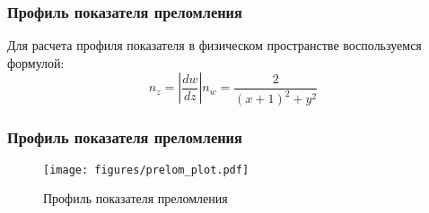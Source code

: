 \begin{frame}\frametitle{Профиль показателя преломления}
	Для расчета профиля показателя в физическом пространстве воспользуемся формулой:
	\begin{equation}
		n_z =
		\left|\frac{dw}{dz}\right| n_w =
		\frac{2}{(x+1)^2+y^2}
		\label{eq:pok_prelom}
	\end{equation}

\end{frame}

\begin{frame}\frametitle{Профиль показателя преломления}
	\begin{figure}
		\texttt{[image: figures/prelom\_plot.pdf]}
		\caption{Профиль показателя преломления}
	\end{figure}
\end{frame}
